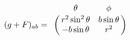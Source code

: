 \begin{equation}
(g+F)_{ab}= \bordermatrix{ &\theta & \phi \cr &r^2 \sin ^2 \theta
& b \sin \theta  \cr & - b \sin \theta & r^2 } \nonumber
\end{equation}

